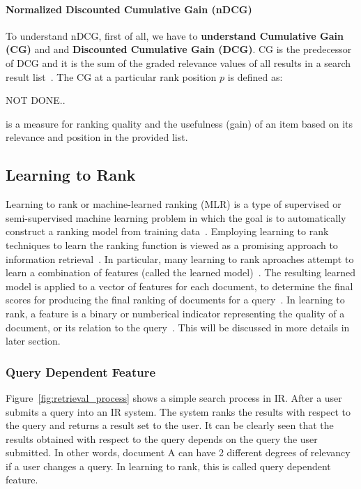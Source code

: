 \paragraph{Normalized Discounted Cumulative Gain (nDCG)}
To understand nDCG, first of all, we have to \textbf{understand Cumulative Gain (CG)} and and \textbf{Discounted Cumulative Gain (DCG)}. 
CG is the predecessor of DCG and it is the sum of the graded relevance values of all results in a search result list~\cite{ndcg}. The CG at a particular 
rank position $p$ is defined as:

NOT DONE..

is a measure for ranking quality and the usefulness (gain) of an item based on its relevance and position in the provided list.

\subsection{Learning to Rank}\label{sec:letor}
Learning to rank or machine-learned ranking (MLR) is a type of supervised or semi-supervised machine learning problem in which the goal is 
to automatically construct a ranking model from training data~\cite{letor}.
Employing learning to rank techniques to learn the ranking function is viewed as
a promising approach to information retrieval~\cite{letor}. In particular, many learning to rank aproaches attempt to learn a combination of features
(called the learned model)~\cite[P. 3]{learningmodel}. The resulting learned model is applied to a vector of features for each document, to determine the final scores for 
producing the final ranking of documents for a query~\cite[P. 3]{learningmodel}. In learning to rank, a feature is a binary or numberical indicator 
representing the quality of a document, or its relation to the query~\cite[P. 4]{learningmodel}. This will be discussed in more details in later section.

\subsubsection{Query Dependent Feature}\label{section:querydependent}
Figure~\ref{fig:retrieval_process} shows a simple search process in IR. After a user submits a query into an IR system. The system ranks the results 
with respect to the query and returns a result set to the user. It can be clearly seen that the results obtained with respect to the query depends on the 
query the user submitted. In other words, document A can have 2 different degrees of relevancy if a user changes a query.
In learning to rank, this is called query dependent feature.

